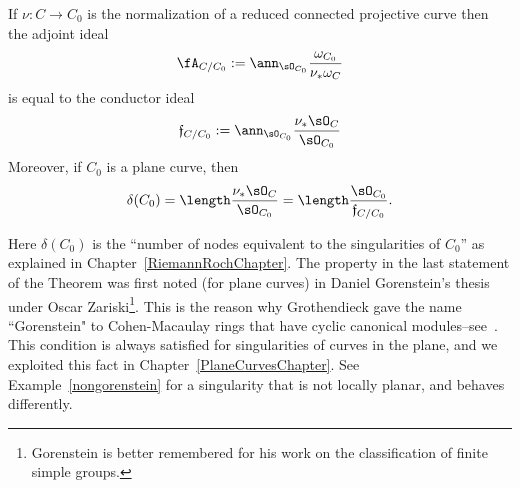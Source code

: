 \begin{theorem}\label{general adjoint}
If $\nu: C \to C_0$ is the normalization of a reduced connected projective curve then the 
adjoint ideal 
$$
\fA_{C/C_0} :=\ann_{\sO_{C_0}}\frac{\omega_{C_0}}{\nu_* \omega_C}
$$
is equal to the conductor ideal
$$
\mathfrak f_{C/C_0}: = \ann_{\sO_{C_0}}\frac{\nu_* \sO_C}{\sO_{C_0}}	
$$
Moreover, if $C_0$ is a plane curve, then 
$$
\delta(C_0) = \length \frac{\nu_* \sO_C}{\sO_{C_0}} = \length \frac {\sO_{C_0}}{\mathfrak f_{C/C_0}}.
$$
\end{theorem}

Here $\delta(C_0)$ is the ``number of nodes equivalent to the singularities of $C_0$'' as
explained in Chapter~\ref{RiemannRochChapter}.  The property in the last statement of the
Theorem  was first noted (for plane curves) in Daniel Gorenstein's thesis under Oscar Zariski\footnote{Gorenstein is better remembered for his work on the classification of finite simple groups.}. This is the
reason why Grothendieck gave the name ``Gorenstein" to Cohen-Macaulay rings that have cyclic canonical 
modules--see~\cite{Bass}. 
This condition is always satisfied for singularities of curves in the plane, and we exploited this fact in Chapter~\ref{PlaneCurvesChapter}.
See Example~\ref{nongorenstein} for a singularity that is not locally planar, and behaves differently.


